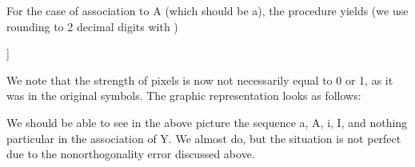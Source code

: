 \documentclass[a4paper,12pt,polish]{jupyterBook}
\begin{document}
\sphinxAtStartPar
For the case of association to A (which should be a), the procedure yields (we use rounding to 2 decimal digits with )
\begin{sphinxVerbatimInput}

\begin{sphinxVerbatim}[commandchars=\\\{\}]
 
\end{sphinxVerbatim}
\end{sphinxVerbatimInput}
\begin{sphinxVerbatimOutput}

\begin{sphinxVerbatim}[commandchars=\\\{\}]
[[0.   0.   0.   0.   0.   0.   0.   0.   0.   0.   0.   0.  ]
 [0.   0.   0.   0.   0.25 0.85 0.25 0.   0.   0.   0.   0.  ]
 [0.   0.   0.   0.   0.   0.85 0.   0.   0.   0.   0.   0.  ]
 [0.   0.   0.   1.   1.6  1.85 1.89 0.   0.   0.   0.   0.  ]
 [0.   0.   1.   0.   0.6  0.25 1.6  0.   0.   0.   0.   0.  ]
 [0.   0.   1.   0.6  0.   0.54 1.29 0.6  0.   0.   0.   0.  ]
 [0.   0.   1.   0.6  0.   0.25 1.29 0.6  0.   0.   0.   0.  ]
 [0.   0.   0.6  1.6  1.6  1.85 1.89 1.6  0.6  0.   0.   0.  ]
 [0.   0.   0.6  0.   0.   0.25 0.29 0.   0.6  0.   0.   0.  ]
 [0.   0.6  0.   0.   0.   0.25 0.   0.29 0.29 0.6  0.   0.  ]
 [0.   0.6  0.   0.   0.25 0.25 0.25 0.   0.   0.6  0.   0.  ]
 [0.   0.   0.   0.   0.   0.   0.   0.   0.   0.   0.   0.  ]]
\end{sphinxVerbatim}
\end{sphinxVerbatimOutput}

\sphinxAtStartPar
We note that the strength of pixels is now not necessarily equal to 0 or 1, as it was in the original symbols. The graphic representation looks as follows:
\begin{sphinxVerbatimOutput}

\noindent{}
\end{sphinxVerbatimOutput}

\sphinxAtStartPar
We should be able to see in the above picture the sequence a, A, i, I, and nothing particular in the association of Y. We almost do, but the situation is not perfect due to the nonorthogonality error discussed above.
\end{document}
